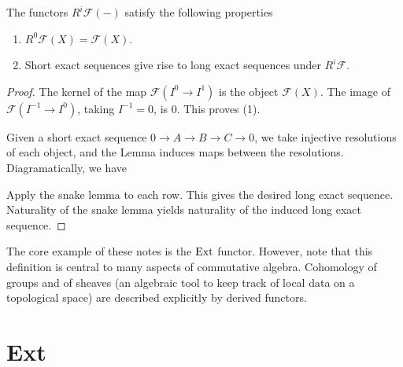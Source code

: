 \begin{theorem}
    The functors $R^i \mathcal{F}({-})$ satisfy the following properties
    \begin{enumerate}
        \item $R^0 \mathcal{F}(X) = \mathcal{F}(X)$.
        \item Short exact sequences give rise to long exact sequences under $R^i \mathcal{F}$.
    \end{enumerate}

    \begin{proof}
        The kernel of the map $\mathcal{F}(I^0 \to I^1)$ is the object $\mathcal{F}(X)$. The image of $\mathcal{F}(I^{-1} \to I^0)$, taking $I^{-1} = 0$, is $0$. This proves (1).

        Given a short exact sequence $0 \to A \to B \to C \to 0$, we take injective resolutions of each object, and the Lemma induces maps between the resolutions. Diagramatically, we have
        \begin{center}
        \end{center}
        Apply the snake lemma to each row. This gives the desired long exact sequence. Naturality of the snake lemma yields naturality of the induced long exact sequence.
    \end{proof}
\end{theorem}

\begin{example}
    The core example of these notes is the $\operatorname{Ext}$ functor. However, note that this definition is central to many aspects of commutative algebra. Cohomology of groups and of sheaves (an algebraic tool to keep track of local data on a topological space) are described explicitly by derived functors.
\end{example}

\section{Ext}

